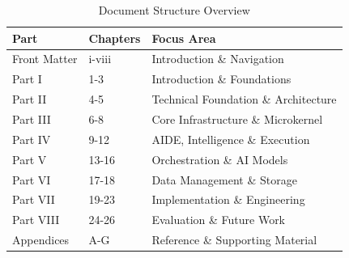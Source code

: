\begin{table}[ht]
\centering
\begin{tabular}{@{}lll@{}}
\toprule
\textbf{Part} & \textbf{Chapters} & \textbf{Focus Area} \\
\midrule
Front Matter & i-viii & Introduction \& Navigation \\
Part I & 1-3 & Introduction \& Foundations \\
Part II & 4-5 & Technical Foundation \& Architecture \\
Part III & 6-8 & Core Infrastructure \& Microkernel \\
Part IV & 9-12 & AIDE, Intelligence \& Execution \\
Part V & 13-16 & Orchestration \& AI Models \\
Part VI & 17-18 & Data Management \& Storage \\
Part VII & 19-23 & Implementation \& Engineering \\
Part VIII & 24-26 & Evaluation \& Future Work \\
Appendices & A-G & Reference \& Supporting Material \\
\bottomrule
\end{tabular}
\caption{Document Structure Overview}
\end{table}

\clearpage
